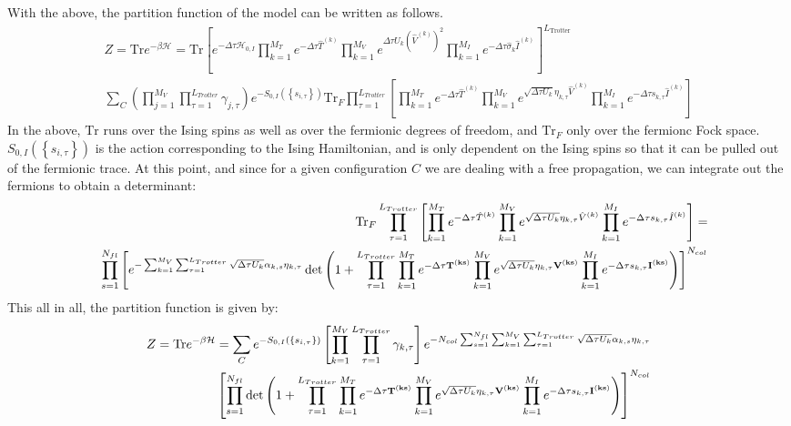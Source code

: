 With the above, the partition function of the model can be written as follows.
\begin{eqnarray}
Z = \text {Tr}   e^{-\beta \mathcal{H} } =   \text {Tr}  \left[ e^{-\Delta \tau \mathcal{H}_{0,I}}   \prod_{k=1}^{M_T}   e^{-\Delta \tau \hat{T}^{(k)}}  
    \prod_{k=1}^{M_V}   e^{  \Delta \tau  U_k \left(  \hat{V}^{(k)} \right)^2}   \prod_{k=1}^{M_I}   e^{  -\Delta \tau  \hat{\sigma}_{k}  \hat{I}^{(k)}} 
   \right]^{L_{\text{Trotter}}}  \nonumber \\
   \sum_{C} \left( \prod_{j=1}^{M_V} \prod_{\tau=1}^{L_{Trotter}} \gamma_{j,\tau} \right) e^{-S_{0,I} \left( \left\{ s_{i,\tau} \right\}  \right) } 
    \text {Tr}_{F}   \prod_{\tau=1}^{L_{Trotter}} \left[   \prod_{k=1}^{M_T}   e^{-\Delta \tau \hat{T}^{(k)}}  
    \prod_{k=1}^{M_V}   e^{  \sqrt{ \Delta \tau  U_k} \eta_{k,\tau} \hat{V}^{(k)} }   \prod_{k=1}^{M_I}   e^{  -\Delta \tau s_{k,\tau}  \hat{I}^{(k)}}  \right] \nonumber
\end{eqnarray}
In the above,  $\text {Tr} $  runs over the Ising spins as well as over the fermionic degrees of freedom, and $ \text {Tr}_{F}  $ only over the  fermionc Fock space. 
$S_{0,I} \left( \left\{ s_{i,\tau} \right\}  \right)  $ is the action  corresponding to the Ising Hamiltonian,  and is only dependent on the Ising spins so that  it can be pulled out of the fermionic trace.
At this point,  and  since for a given configuration $C$  we are dealing with a free propagation, we can integrate out the fermions to obtain a determinant: 
\begin{eqnarray}
& &  \text {Tr}_{F}   \prod_{\tau=1}^{L_{Trotter}} \left[   \prod_{k=1}^{M_T}   e^{-\Delta \tau \hat{T}^{(k)}}  
    \prod_{k=1}^{M_V}   e^{  \sqrt{ \Delta \tau  U_k} \eta_{k,\tau} \hat{V}^{(k)} }   \prod_{k=1}^{M_I}   e^{  -\Delta \tau s_{k,\tau}  \hat{I}^{(k)}}  \right]  =   \\
&&    \prod_{s=1}^{N_{fl}} \left[  e^{- \sum_{k=1}^{M_V} \sum_{\tau = 1}^{L_{Trotter}}\sqrt{\Delta \tau U_k}  \alpha_{k,s} \eta_{k,\tau} } \det\left(  1 + 
     \prod_{\tau=1}^{L_{Trotter}}   \prod_{k=1}^{M_T}   e^{-\Delta \tau \bf{T}^{(ks)}}  
    \prod_{k=1}^{M_V}   e^{  \sqrt{ \Delta \tau  U_k} \eta_{k,\tau} \bf{V}^{(ks)} }   \prod_{k=1}^{M_I}   e^{  -\Delta \tau s_{k,\tau}  \bf{I}^{(ks)}}  
     \right) \right]^{N_{col}}  \nonumber 
\end{eqnarray}
This all in all, the partition function is given by:
\begin{eqnarray}
	Z = \text {Tr}   e^{-\beta \mathcal{H} }  =   \sum_{C}   e^{-S_{0,I} \left( \left\{ s_{i,\tau} \right\}  \right) }     \left[ \prod_{k=1}^{M_V} \prod_{\tau=1}^{L_{Trotter}} \gamma_{k,\tau} \right] 
	  e^{- N_{col }\sum_{s=1}^{N_{fl}} \sum_{k=1}^{M_V} \sum_{\tau = 1}^{L_{Trotter}}\sqrt{\Delta \tau U_k}  \alpha_{k,s} \eta_{k,\tau} }   \nonumber \\
	   \left[   \prod_{s=1}^{N_{fl}}\det\left(  1 + 
     \prod_{\tau=1}^{L_{Trotter}}   \prod_{k=1}^{M_T}   e^{-\Delta \tau \bf{T}^{(ks)}}  
    \prod_{k=1}^{M_V}   e^{  \sqrt{ \Delta \tau  U_k} \eta_{k,\tau} \bf{V}^{(ks)} }   \prod_{k=1}^{M_I}   e^{  -\Delta \tau s_{k,\tau}  \bf{I}^{(ks)}}  
     \right) \right]^{N_{col}} 
\end{eqnarray}

